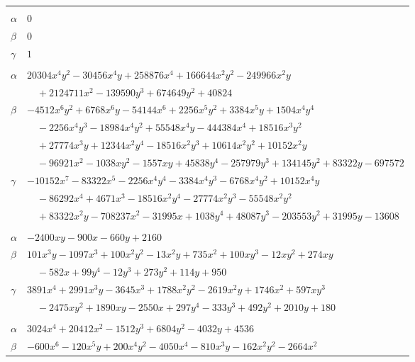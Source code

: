 \documentclass[11pt]{article}
\begin{document}
\begin{longtable}{@{}ll@{}}
\addlinespace[3pt]
\multicolumn{2}{@{}l}{$\{i,j\}=\{18,176\}$, $k_{ij}=2$}\\
$\alpha$ & $0$\\
$\beta$ & $0$\\
$\gamma$ & $1$\\
\addlinespace[3pt]
\multicolumn{2}{@{}l}{$\{i,j\}=\{18,178\}$, $k_{ij}=2^{3}\cdot 3^{7}\cdot 7$}\\
$\alpha$ & $20304x^{4}y^{2}-30456x^{4}y+258876x^{4}+166644x^{2}y^{2}-249966x^{2}y$\\
 & $\quad +2124711x^{2}-139590y^{3}+674649y^{2}+40824$\\
$\beta$ & $-4512x^{6}y^{2}+6768x^{6}y-54144x^{6}+2256x^{5}y^{2}+3384x^{5}y+1504x^{4}y^{4}$\\
 & $\quad -2256x^{4}y^{3}-18984x^{4}y^{2}+55548x^{4}y-444384x^{4}+18516x^{3}y^{2}$\\
 & $\quad +27774x^{3}y+12344x^{2}y^{4}-18516x^{2}y^{3}+10614x^{2}y^{2}+10152x^{2}y$\\
 & $\quad -96921x^{2}-1038xy^{2}-1557xy+45838y^{4}-257979y^{3}+134145y^{2}+83322y-697572$\\
$\gamma$ & $-10152x^{7}-83322x^{5}-2256x^{4}y^{4}-3384x^{4}y^{3}-6768x^{4}y^{2}+10152x^{4}y$\\
 & $\quad -86292x^{4}+4671x^{3}-18516x^{2}y^{4}-27774x^{2}y^{3}-55548x^{2}y^{2}$\\
 & $\quad +83322x^{2}y-708237x^{2}-31995x+1038y^{4}+48087y^{3}-203553y^{2}+31995y-13608$\\
\addlinespace[3pt]
\multicolumn{2}{@{}l}{$\{i,j\}=\{18,179\}$, $k_{ij}=2^{4}\cdot 3^{4}\cdot 5$}\\
$\alpha$ & $-2400xy-900x-660y+2160$\\
$\beta$ & $101x^{3}y-1097x^{3}+100x^{2}y^{2}-13x^{2}y+735x^{2}+100xy^{3}-12xy^{2}+274xy$\\
 & $\quad -582x+99y^{4}-12y^{3}+273y^{2}+114y+950$\\
$\gamma$ & $3891x^{4}+2991x^{3}y-3645x^{3}+1788x^{2}y^{2}-2619x^{2}y+1746x^{2}+597xy^{3}$\\
 & $\quad -2475xy^{2}+1890xy-2550x+297y^{4}-333y^{3}+492y^{2}+2010y+180$\\
\addlinespace[3pt]
\multicolumn{2}{@{}l}{$\{i,j\}=\{18,217\}$, $k_{ij}=2^{3}\cdot 3^{5}\cdot 7$}\\
$\alpha$ & $3024x^{4}+20412x^{2}-1512y^{3}+6804y^{2}-4032y+4536$\\
$\beta$ & $-600x^{6}-120x^{5}y+200x^{4}y^{2}-4050x^{4}-810x^{3}y-162x^{2}y^{2}-2664x^{2}$\\

\end{longtable}
\end{document}

